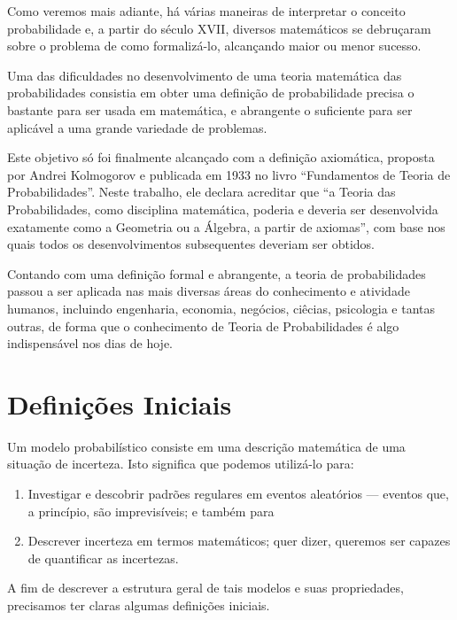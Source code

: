 \documentclass[
]{book}
\theoremstyle{definition}
\theoremstyle{definition}
\theoremstyle{definition}
\theoremstyle{remark}
\begin{document}
Como veremos mais adiante, há várias maneiras de interpretar o conceito probabilidade e, a partir do século XVII, diversos matemáticos se debruçaram sobre o problema de como formalizá-lo, alcançando maior ou menor sucesso.

Uma das dificuldades no desenvolvimento de uma teoria matemática das probabilidades consistia em obter uma definição de probabilidade precisa o bastante para ser usada em matemática, e abrangente o suficiente para ser aplicável a uma grande variedade de problemas.

Este objetivo só foi finalmente alcançado com a definição axiomática, proposta por Andrei Kolmogorov e publicada em 1933 no livro ``Fundamentos de Teoria de Probabilidades''. Neste trabalho, ele declara acreditar que ``a Teoria das Probabilidades, como disciplina matemática, poderia e deveria ser desenvolvida exatamente como a Geometria ou a Álgebra, a partir de axiomas'', com base nos quais todos os desenvolvimentos subsequentes deveriam ser obtidos.

Contando com uma definição formal e abrangente, a teoria de probabilidades passou a ser aplicada nas mais diversas áreas do conhecimento e atividade humanos, incluindo engenharia, economia, negócios, ciêcias, psicologia e tantas outras, de forma que o conhecimento de Teoria de Probabilidades é algo indispensável nos dias de hoje.

\hypertarget{definiuxe7uxf5es-iniciais}{%
\section{Definições Iniciais}\label{definiuxe7uxf5es-iniciais}}

Um modelo probabilístico consiste em uma descrição matemática de uma situação de incerteza. Isto significa que podemos utilizá-lo para:

\begin{enumerate}
\def\labelenumi{(\arabic{enumi})}
\item
  Investigar e descobrir padrões regulares em eventos aleatórios --- eventos que, a princípio, são imprevisíveis; e também para
\item
  Descrever incerteza em termos matemáticos; quer dizer, queremos ser capazes de quantificar as incertezas.
\end{enumerate}

A fim de descrever a estrutura geral de tais modelos e suas propriedades, precisamos ter claras algumas definições iniciais.
\end{document}
